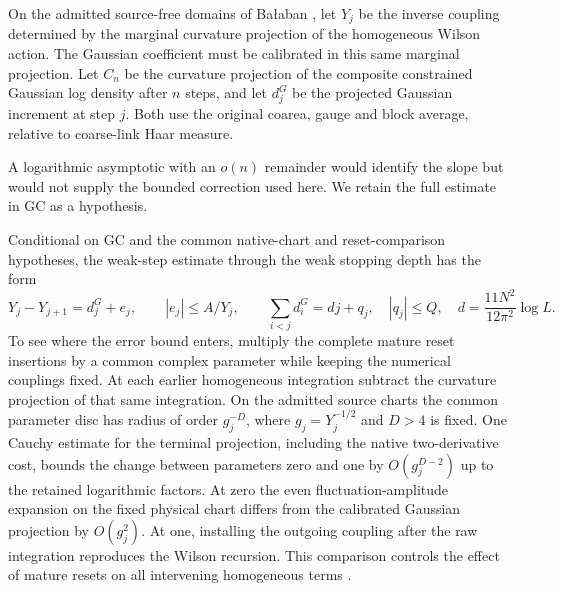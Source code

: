 \documentclass[11pt,letterpaper]{article}
\begin{document}
On the admitted source-free domains of Ba\l aban
\cite{Bal119,BalLFR2}, let \(Y_j\) be the inverse coupling determined by
the marginal curvature projection of the homogeneous Wilson action. The Gaussian coefficient must be calibrated in this same marginal projection.
Let \(C_n\) be the curvature projection of the composite constrained Gaussian
log density after \(n\) steps, and let \(d_j^G\) be the projected Gaussian
increment at step \(j\). Both use the original coarea, gauge and block
average, relative to coarse-link Haar measure.

A logarithmic asymptotic with an \(o(n)\) remainder would identify the
slope but would not supply the bounded correction used here. We retain
the full estimate in GC as a hypothesis.

Conditional on GC and the common native-chart and reset-comparison
hypotheses, the weak-step estimate through the weak stopping depth
\cite[Apps.~F and G]{boundary} has the form
\[
  Y_j-Y_{j+1}=d_j^{G}+e_j,\qquad |e_j|\le A/Y_j,\qquad
  \sum_{i<j}d_i^{G}=dj+q_j,\quad |q_j|\le Q,\quad
  d=\frac{11N^2}{12\pi^2}\log L .
\]
To see where the error bound enters, multiply the complete mature reset
insertions by a common complex parameter while keeping the numerical
couplings fixed. At each earlier homogeneous integration subtract the
curvature projection of that same integration. On the admitted source
charts the common parameter disc has radius of order \(g_j^{-D}\), where
\(g_j=Y_j^{-1/2}\) and \(D>4\) is fixed. One Cauchy estimate for the
terminal projection, including the native two-derivative cost, bounds
the change between parameters zero and one by \(O(g_j^{D-2})\) up to
the retained logarithmic factors. At zero the even fluctuation-amplitude
expansion on the fixed physical chart differs from the calibrated
Gaussian projection by \(O(g_j^2)\). At one, installing the outgoing
coupling after the raw integration reproduces the Wilson recursion.
This comparison controls the effect of mature resets on all intervening
homogeneous terms \cite[BP.17--34, DE.1--15]{boundary}.
\end{document}

